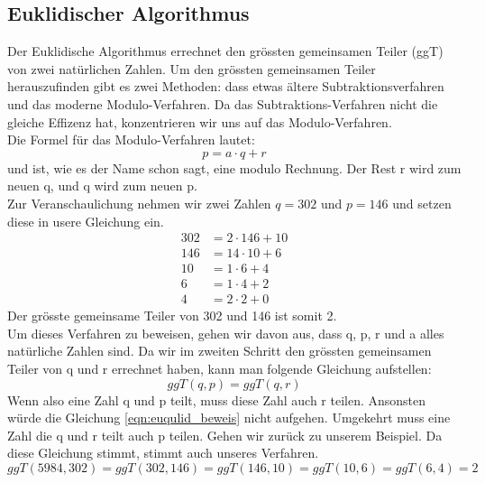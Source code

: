 \subsection{Euklidischer Algorithmus}
Der Euklidische Algorithmus errechnet den grössten gemeinsamen Teiler (ggT) von zwei natürlichen Zahlen. Um den grössten gemeinsamen Teiler herauszufinden gibt es zwei Methoden: dass etwas ältere Subtraktionsverfahren und das moderne Modulo-Verfahren. Da das Subtraktions-Verfahren nicht die gleiche Effizenz hat, konzentrieren wir uns auf das Modulo-Verfahren.\\
Die Formel für das Modulo-Verfahren lautet:
%
\begin{equation}
  \label{eqn:euklidischer_algo}
  p = a \cdot q + r
\end{equation}
%
und ist, wie es der Name schon sagt, eine modulo Rechnung. Der Rest r wird zum neuen q, und q wird zum neuen p. \\
Zur Veranschaulichung nehmen wir zwei Zahlen $q = 302$ und $p = 146$ und setzen diese in usere Gleichung ein.
%
\begin{equation}
  \begin{split}
    302 & = 2 \cdot 146 + 10 \\
    146 & = 14 \cdot 10 + 6  \\
    10 & = 1 \cdot 6 + 4  \\
    6 & = 1 \cdot 4 + 2  \\
    4 & = 2 \cdot 2 + 0
    \label{eqn:euqulid_beweis}
  \end{split}
\end{equation}
%
Der grösste gemeinsame Teiler von 302 und 146 ist somit 2. \\[2ex]
Um dieses Verfahren zu beweisen, gehen wir davon aus, dass q, p, r und a alles natürliche Zahlen sind. Da wir im zweiten Schritt den grössten gemeinsamen Teiler von q und r errechnet haben, kann man folgende Gleichung aufstellen:
%
\begin{equation}
  ggT(q,p) = ggT(q,r)
\end{equation}
%
Wenn also eine Zahl q und p teilt, muss diese Zahl auch r teilen. Ansonsten würde die Gleichung \ref{eqn:euqulid_beweis} nicht aufgehen. Umgekehrt muss eine Zahl die q und r teilt auch p teilen. 
Gehen wir zurück zu unserem Beispiel. Da diese Gleichung stimmt, stimmt auch unseres Verfahren.
%
\begin{equation*}
 ggT(5984,302) = ggT(302,146) = ggT(146,10) = ggT(10,6) = ggT(6,4) = 2 
\end{equation*}
%
